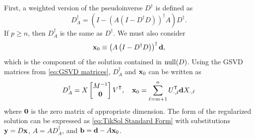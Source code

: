 First, a weighted version of the pseudoinverse $D^\dagger$ is defined as
\[D_{A}^\dagger = \left(I - \left(A\left(I - D^\dagger D\right)\right)^\dagger A\right)D^\dagger.\]
If $p \geq n$, then $D_{A}^\dagger$ is the same as $D^\dagger$. We must also consider
\[\mathbf{x}_0 \equiv \left(A\left(I - D^\dagger D\right)\right)^\dagger \mathbf{d},\]
which is the component of the solution contained in $\operatorname{null}(D)$.  Using the GSVD matrices from \eqref{eq:GSVD matrices}, $D_{A}^\dagger$ and $\mathbf{x}_0$ can be written as
\begin{equation}
\label{eq:Trans. 1}
D_{A}^\dagger = X \begin{bmatrix}
M^{-1} \\
\mathbf{0}
\end{bmatrix}{V}^\mathsf{T}, \quad \mathbf{x}_0 = \sum_{\ell=m+1}^{n} {U}^\mathsf{T}_{\cdot,\ell}\mathbf{d} X_{\cdot,\ell}
\end{equation}
where $\bm{0}$ is the zero matrix of appropriate dimension. The form of the regularized solution can be expressed as \eqref{eq:TikSol Standard Form} with substitutions $\mathbf{y} = D\mathbf{x}$, $A = A{D_{A}^\dagger}$, and $\mathbf{b} = \mathbf{d} - A\mathbf{x}_0$. 
